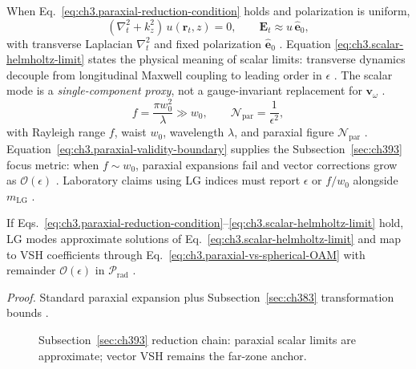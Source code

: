 When Eq.~\eqref{eq:ch3.paraxial-reduction-condition} holds and polarization is uniform,
\begin{equation}
\label{eq:ch3.scalar-helmholtz-limit}
(\nabla_{t}^{2}+k_{z}^{2})\,u(\mathbf{r}_{t},z)
=
0,
\qquad
\mathbf{E}_{t}\approx u\,\hat{\mathbf{e}}_{0},
\end{equation}
with transverse Laplacian \(\nabla_{t}^{2}\) and fixed polarization \(\hat{\mathbf{e}}_{0}\) \cite{jackson1999}. Equation
\eqref{eq:ch3.scalar-helmholtz-limit} states the physical meaning of scalar limits: transverse dynamics decouple from longitudinal Maxwell
coupling to leading order in \(\epsilon\) \cite{harrington2001}. The scalar mode is a \emph{single-component proxy}, not a
gauge-invariant replacement for \(\mathbf{v}_\omega\) \cite{belinfante1940}.
\begin{equation}
\label{eq:ch3.paraxial-validity-boundary}
f
=
\frac{\pi w_{0}^{2}}{\lambda}
\gg w_{0},
\qquad
\mathcal{N}_{\mathrm{par}}
=
\frac{1}{\epsilon^{2}},
\end{equation}
with Rayleigh range \(f\), waist \(w_{0}\), wavelength \(\lambda\), and paraxial figure \(\mathcal{N}_{\mathrm{par}}\) \cite{jackson1999}.
Equation~\eqref{eq:ch3.paraxial-validity-boundary} supplies the Subsection~\ref{sec:ch393} focus metric: when \(f\sim w_{0}\), paraxial
expansions fail and vector corrections grow as \(\mathcal{O}(\epsilon)\) \cite{allen1992}. Laboratory claims
using LG indices must report \(\epsilon\) or \(f/w_{0}\) alongside \(m_{\mathrm{LG}}\) \cite{harrington2001}.
\begin{theorem}
\label{thm:ch3.paraxial-consistent-reduction}
If Eqs.~\eqref{eq:ch3.paraxial-reduction-condition}--\eqref{eq:ch3.scalar-helmholtz-limit} hold, LG modes approximate solutions of
Eq.~\eqref{eq:ch3.scalar-helmholtz-limit} and map to VSH coefficients through Eq.~\eqref{eq:ch3.paraxial-vs-spherical-OAM} with remainder
\(\mathcal{O}(\epsilon)\) in \(\mathcal{P}_{\mathrm{rad}}\) \cite{allen1992}.
\end{theorem}
\noindent\textit{Proof.}
Standard paraxial expansion \cite{allen1992} plus Subsection~\ref{sec:ch383} transformation bounds \cite{hansen1988}.
\begin{figure}[t]
\centering
{}
\caption{Subsection~\ref{sec:ch393} reduction chain: paraxial scalar limits are approximate; vector VSH remains the far-zone anchor.}
\label{fig:ch3.393-reduction-chain}
\end{figure}
